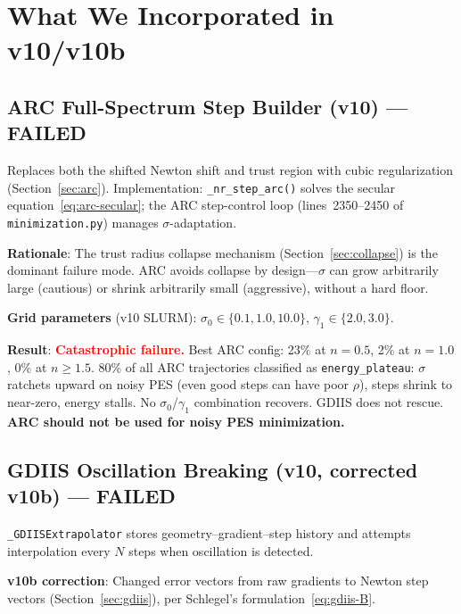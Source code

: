 \documentclass[11pt,a4paper]{article}
\theoremstyle{definition}
\begin{document}
\section{What We Incorporated in v10/v10b}
\label{sec:incorporated}

\subsection{ARC Full-Spectrum Step Builder (v10) --- FAILED}

Replaces both the shifted Newton shift and trust region with cubic
regularization (Section~\ref{sec:arc}).  Implementation:
\texttt{\_nr\_step\_arc()} solves the secular
equation~\eqref{eq:arc-secular}; the ARC step-control loop
(lines~2350--2450 of \texttt{minimization.py}) manages $\sigma$-adaptation.

\textbf{Rationale}: The trust radius collapse mechanism
(Section~\ref{sec:collapse}) is the dominant failure mode.  ARC avoids
collapse by design---$\sigma$ can grow arbitrarily large (cautious) or
shrink arbitrarily small (aggressive), without a hard floor.

\textbf{Grid parameters} (v10 SLURM):
$\sigma_0 \in \{0.1, 1.0, 10.0\}$,
$\gamma_1 \in \{2.0, 3.0\}$.

\textbf{Result}: \textcolor{red}{\textbf{Catastrophic failure.}}  Best ARC
config: 23\% at $n=0.5$, 2\% at $n=1.0$, 0\% at $n\geq 1.5$.
80\% of all ARC trajectories classified as \texttt{energy\_plateau}:
$\sigma$ ratchets upward on noisy PES (even good steps can have poor
$\rho$), steps shrink to near-zero, energy stalls.
No $\sigma_0$/$\gamma_1$ combination recovers.  GDIIS does not rescue.
\textbf{ARC should not be used for noisy PES minimization.}

\subsection{GDIIS Oscillation Breaking (v10, corrected v10b) --- FAILED}

\texttt{\_GDIISExtrapolator} stores geometry--gradient--step history and
attempts interpolation every $N$ steps when oscillation is detected.

\textbf{v10b correction}: Changed error vectors from raw gradients to Newton
step vectors (Section~\ref{sec:gdiis}), per Schlegel's
formulation~\eqref{eq:gdiis-B}.
\end{document}
